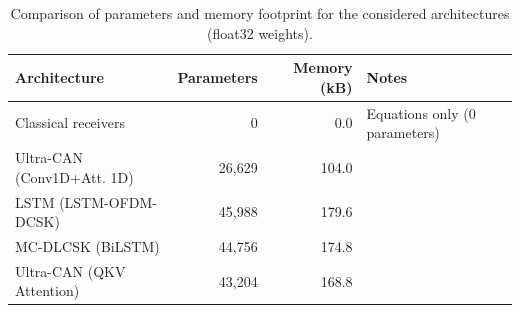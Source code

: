 \begin{table}[t]
\centering
\caption{Comparison of parameters and memory footprint for the considered architectures (float32 weights).}
\label{tab:weight_comparison}
\begin{tabular}{l r r l}
\toprule
\textbf{Architecture} & \textbf{Parameters} & \textbf{Memory (kB)} & \textbf{Notes} \\
\midrule
Classical receivers & 0 & 0.0 & Equations only (0 parameters) \\
Ultra-CAN (Conv1D+Att. 1D) & 26,629 & 104.0 &  \\
LSTM (LSTM-OFDM-DCSK) & 45,988 & 179.6 &  \\
MC-DLCSK (BiLSTM) & 44,756 & 174.8 &  \\
Ultra-CAN (QKV Attention) & 43,204 & 168.8 &  \\
\bottomrule
\end{tabular}
\end{table}